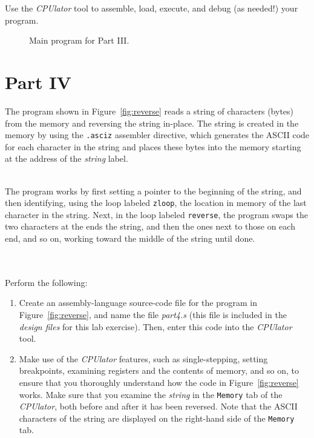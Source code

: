 \documentclass[epsfig,10pt,fullpage]{article}
\begin{document}
\noindent
Use the {\it CPUlator} tool to assemble, load, execute, and debug (as needed!) your program. 

\begin{figure}[h]
\begin{center}

\end{center}
\caption{Main program for Part III.}
\label{fig:main}
\end{figure}

\newpage
\section*{Part IV}

The program shown in Figure~\ref{fig:reverse} reads a string of characters (bytes) from
the memory and reversing the string in-place. The string is created in the memory by using
the \texttt{.asciz} assembler directive, which generates the ASCII code for each character
in the string and places these bytes into the memory starting at the address of 
the {\it string} label.

~\\
\noindent
The program works by first setting a pointer
to the beginning of the string, and then identifying, using the loop labeled 
\texttt{zloop}, the location in memory of the last character in the string. Next, in the 
loop labeled \texttt{reverse}, the program swaps the two characters 
at the ends the string, and then the ones next to those on each end,
and so on, working toward the middle of the string until done. 

~\\
\noindent
~\\
\noindent
Perform the following:

\setlength{\fboxsep}{1pt}
\begin{enumerate}
\item Create an assembly-language source-code file for the program in
Figure~\ref{fig:reverse}, and name the file {\it part4.s} (this file is included in 
the {\it design files} for this lab exercise). Then, enter this code into 
the {\it CPUlator} tool.
\item
Make use of the {\it CPUlator} features, such as single-stepping, setting breakpoints, 
examining registers and the contents of memory, and so on, to ensure that
you thoroughly understand how the code in Figure~\ref{fig:reverse} works.
Make sure that you examine the {\it string} in the \texttt{Memory} tab of the {\it CPUlator}, 
both before and after it has been reversed. Note that the ASCII characters of the string
are displayed on the right-hand side of the \texttt{Memory} tab.
\end{enumerate}
\end{document}
